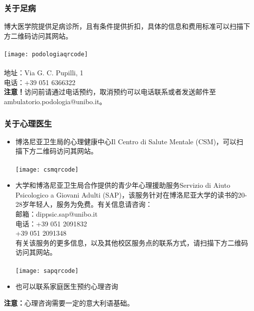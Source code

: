 \subsubsection{关于足病}
博大医学院提供足病诊所，且有条件提供折扣，具体的信息和费用标准可以扫描下方二维码访问其网站。\\
\\
\texttt{[image: podologiaqrcode]}\\
\\
地址：Via G. C. Pupilli, 1\\
电话：+39 051 6366322\\
\textbf{注意！}访问前请通过电话预约，取消预约可以电话联系或者发送邮件至ambulatorio.podologia@unibo.it。

\subsubsection{关于心理医生}
\begin{itemize}
\item	博洛尼亚卫生局的心理健康中心Il Centro di Salute Mentale (CSM)，可以扫描下方二维码访问其网站。\\
\\
\texttt{[image: csmqrcode]}\\
\item	大学和博洛尼亚卫生局合作提供的青少年心理援助服务Servizio di Aiuto Psicologico a Giovani Adulti (SAP)，该服务针对在博洛尼亚大学的读书的20-28岁年轻人，服务为免费。有关信息请咨询：\\
邮箱：dippsic.sap@unibo.it\\
电话：+39 051 2091832\\
+39 051 2091348\\
有关该服务的更多信息，以及其他校区服务点的联系方式，请扫描下方二维码访问其网站。\\
\\
\texttt{[image: sapqrcode]}\\
\item	也可以联系家庭医生预约心理咨询
\end{itemize}
\textbf{注意：}心理咨询需要一定的意大利语基础。


